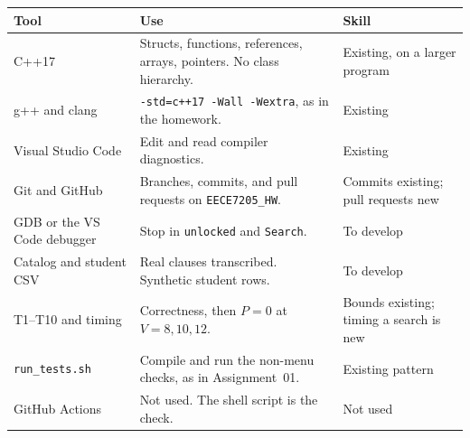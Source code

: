 \documentclass[10pt]{article}
\begin{document}
{\footnotesize
\begin{tabularx}{\textwidth}{@{}>{\raggedright\arraybackslash}p{1.15in} Y >{\raggedright\arraybackslash}p{1.45in}@{}}
\toprule
\textbf{Tool} & \textbf{Use} & \textbf{Skill} \\
\midrule
C++17 & Structs, functions, references, arrays, pointers. No class hierarchy. &
Existing, on a larger program \\
g++ and clang & \texttt{-std=c++17 -Wall -Wextra}, as in the homework. & Existing \\
Visual Studio Code & Edit and read compiler diagnostics. & Existing \\
Git and GitHub & Branches, commits, and pull requests on \texttt{EECE7205\_HW}. &
Commits existing; pull requests new \\
GDB or the VS Code debugger & Stop in \texttt{unlocked} and \texttt{Search}. & To develop \\
Catalog and student CSV & Real clauses transcribed. Synthetic student rows. & To develop \\
T1--T10 and timing & Correctness, then \(P = 0\) at \(V = 8, 10, 12\). &
Bounds existing; timing a search is new \\
\texttt{run\_tests.sh} & Compile and run the non-menu checks, as in Assignment~01. & Existing pattern \\
GitHub Actions & Not used. The shell script is the check. & Not used \\
\bottomrule
\end{tabularx}}
\end{document}

